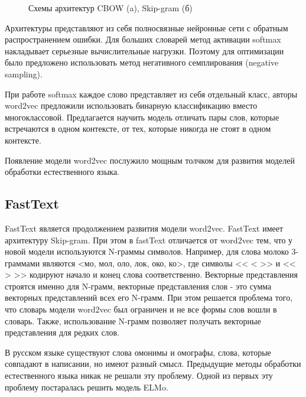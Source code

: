 \documentclass[a4paper,14pt]{article}
\begin{document}
\begin{figure}[H]
\begin{minipage}[h]{0.49\linewidth}
	\end{minipage}
	\caption{Схемы архитектур CBOW (a), Skip-gram (б)}
	\label{fig:word2vec}
\end{figure}

Архитектуры представляют из себя полносвязные нейронные сети с обратным распространением ошибки.
Для больших словарей метод активации softmax накладывает серьезные вычислительные нагрузки.
Поэтому для оптимизации было предложено использовать метод негативного семплирования (negative sampling).

При работе softmax каждое слово  представляет из себя отдельный класс, авторы word2vec предложили использовать бинарную классификацию вместо многоклассовой.
Предлагается научить модель отличать пары слов, которые встречаются в одном контексте, от тех, которые никогда не стоят в одном контексте.

Появление модели word2vec послужило мощным толчком для развития моделей обработки естественного языка.


\subsection{FastText}

FastText \cite{ft} является продолжением развития модели word2vec.
FastText имеет архитектуру Skip-gram.
При этом в fastText отличается от word2vec тем, что у новой модели используются N-граммы символов.
Например, для слова молоко 3-граммами являются <мо, мол, оло, лок, око, ко>, где символы << < >> и << > >> кодируют начало и конец слова соответственно.
Векторные представления строятся именно для N-грамм, векторные представления слов - это сумма векторных представлений всех его N-грамм.
При этом решается проблема того, что словарь модели word2vec был ограничен и не все формы слов вошли в словарь.
Также, использование N-грамм позволяет получать векторные представления для редких слов.

В русском языке существуют слова омонимы и омографы, слова, которые совпадают в написании, но имеют разный смысл.
Предыдущие методы обработки естественного языка никак не решали эту проблему.
Одной из первых эту проблему постаралась решить модель ELMo.
\end{document}
